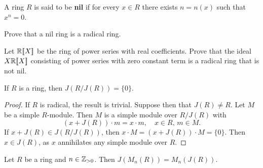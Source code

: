 
\begin{definition}
A ring $R$ is said to be \textbf{nil} if for every $x\in R$ there
exists $n=n(x)$ such that $x^n=0$. 
\end{definition}

\begin{exercise}
    Prove that a nil ring is a radical ring. 
\end{exercise}

\begin{exercise}
    Let $\mathbb{R}[\![X]\!]$ be the ring of power series with real coefficients. Prove that the ideal 
    $X\mathbb{R}[\![X]\!]$ consisting of power series with zero constant term is a radical ring
    that is not nil. 
\end{exercise}

\begin{theorem}
	\label{thm:J(R/J)=0}
	If $R$ is a ring, then $J(R/J(R))=\{0\}$.
\end{theorem}

\begin{proof}
	If $R$ is radical, the result is trivial. Suppose then that 
	$J(R)\ne R$. Let $M$ be a simple $R$-module. Then $M$ is 
	a simple module over $R/J(R)$ with 
	\[
		(x+J(R))\cdot m=x\cdot m,\quad
		x\in R,\,m\in M.
	\]
	If $x+J(R)\in J(R/J(R))$, then  $x\cdot M=(x+J(R))\cdot M=\{0\}$. Then $x\in J(R)$, as 
	$x$ annihilates any simple module over $R$.
\end{proof}

\begin{theorem}
	Let $R$ be a ring and $n\in\mathbb{Z}_{>0}$. Then $J(M_n(R))=M_n(J(R))$. 
\end{theorem}

